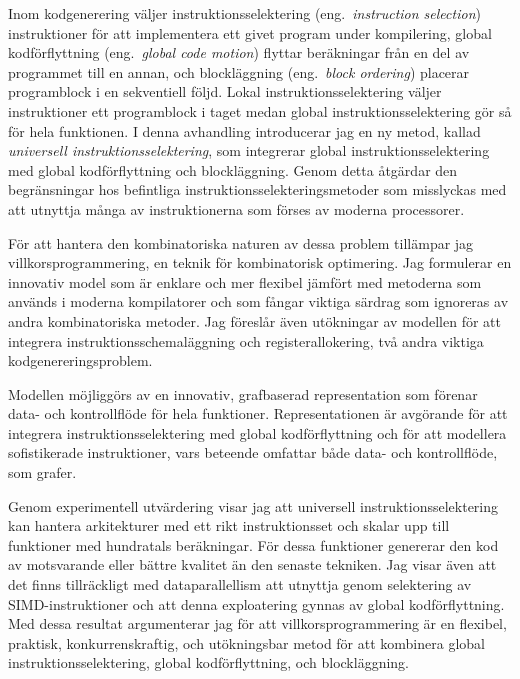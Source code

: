 %

\begin{sammanfattning}
  Inom kodgenerering v\"aljer instruktionsselektering (eng.\ \emph{instruction
    selection}) instruktioner f\"or att implementera ett givet program under
  kompilering, global kodf\"orflyttning (eng.\ \emph{global code motion})
  flyttar ber\"akningar fr\r{a}n en del av programmet till en annan, och
  blockl\"aggning (eng.\ \emph{block ordering}) placerar programblock i en
  sekventiell f\"oljd.
  Lokal instruktionsselektering v\"aljer instruktioner ett programblock i taget
  medan global instruktionsselektering g\"or s\r{a} f\"or hela funktionen.
  I denna avhandling introducerar jag en ny metod, kallad \emph{universell
    instruktionsselektering}, som integrerar global instruktionsselektering med
  global kodf\"orflyttning och blockl\"aggning.
  Genom detta \r{a}tg\"ardar den begr\"ansningar hos befintliga
  instruktionsselekteringsmetoder som misslyckas med att utnyttja m\r{a}nga av
  instruktionerna som f\"orses av moderna processorer.

  F\"or att hantera den kombinatoriska naturen av dessa problem till\"ampar jag
  villkorsprogrammering, en teknik f\"or kombinatorisk optimering.
  Jag formulerar en innovativ model som \"ar enklare och mer flexibel
  j\"amf\"ort med metoderna som anv\"ands i moderna kompilatorer och som
  f\r{a}ngar viktiga s\"ardrag som ignoreras av andra kombinatoriska metoder.
  Jag f\"oresl\r{a}r \"aven ut\"okningar av modellen f\"or att integrera
  instruktionsschemal\"aggning och registerallokering, tv\r{a} andra viktiga
  kodgenereringsproblem.

  Modellen m\"ojligg\"ors av en innovativ, grafbaserad representation som
  f\"orenar data- och kontrollfl\"ode f\"or hela funktioner.
  Representationen \"ar avg\"orande f\"or att integrera instruktionsselektering
  med global kodf\"orflyttning och f\"or att modellera sofistikerade
  instruktioner, vars beteende omfattar b\r{a}de data- och kontrollfl\"ode, som
  grafer.

  Genom experimentell utv\"ardering visar jag att universell
  instruktionsselektering kan hantera arkitekturer med ett rikt instruktionsset
  och skalar upp till funktioner med hundratals ber\"akningar.
  F\"or dessa funktioner genererar den kod av motsvarande eller b\"attre
  kvalitet \"an den senaste tekniken.
  Jag visar \"aven att det finns tillr\"ackligt med dataparallellism att
  utnyttja genom selektering av SIMD-instruktioner och att denna exploatering
  gynnas av global kodf\"orflyttning.
  Med dessa resultat argumenterar jag f\"or att villkorsprogrammering \"ar en
  flexibel, praktisk, konkurrenskraftig, och ut\"okningsbar metod f\"or att
  kombinera global instruktionsselektering, global kodf\"orflyttning, och
  blockl\"aggning.
\end{sammanfattning}
